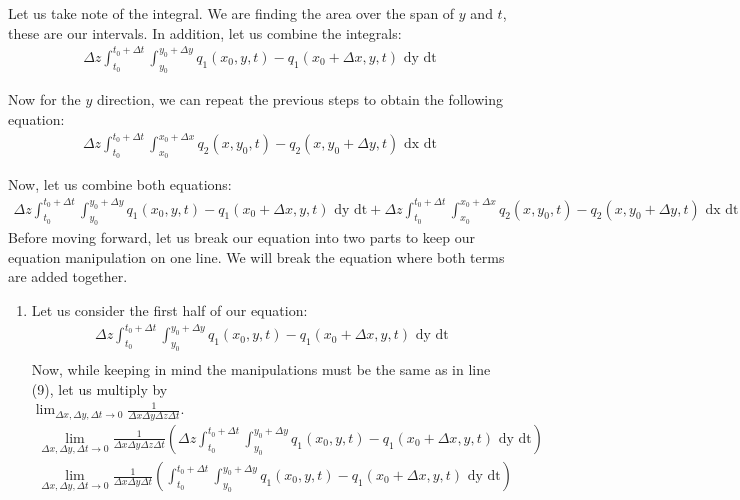 \documentclass{article}
\begin{document}
\begin{enumerate}
\begin{enumerate}
    Let us take note of the integral. We are finding the area over the span of $y$ and $t$, these are our intervals. In addition, let us combine the integrals:
    \begin{align}
      \Delta z \int^{t_0 + \Delta t}_{t_0} \int^{y_0 + \Delta y}_{y_0} q_1(x_0, y, t) - q_1(x_0 + \Delta x, y, t) \text{ dy dt}
    \end{align}

    Now for the $y$ direction, we can repeat the previous steps to obtain the following equation:
    \begin{align}
      \Delta z \int^{t_0 + \Delta t}_{t_0} \int^{x_0 + \Delta x}_{x_0} q_2(x, y_0, t) - q_2(x, y_0 + \Delta y, t) \text{ dx dt}
    \end{align}

    Now, let us combine both equations:
    \begin{align}
      \Delta z \int^{t_0 + \Delta t}_{t_0} \int^{y_0 + \Delta y}_{y_0} q_1(x_0, y, t) - q_1(x_0 + \Delta x, y, t) \text{ dy dt} + \Delta z \int^{t_0 + \Delta t}_{t_0} \int^{x_0 + \Delta x}_{x_0} q_2(x, y_0, t) - q_2(x, y_0 + \Delta y, t) \text{ dx dt}
    \end{align}
    Before moving forward, let us break our equation into two parts to keep our equation manipulation on one line. We will break the equation where both terms are added together.
    \begin{enumerate}
      \item Let us consider the first half of our equation:
      \begin{align}
        \Delta z \int^{t_0 + \Delta t}_{t_0} \int^{y_0 + \Delta y}_{y_0} q_1(x_0, y, t) - q_1(x_0 + \Delta x, y, t) \text{ dy dt}\\
      \end{align}
      Now, while keeping in mind the manipulations must be the same as in line (9), let us multiply by\\
      $\displaystyle \lim_{\Delta x, \Delta y, \Delta t \to 0} \frac{1}{\Delta x \Delta y \Delta z \Delta t}$.
      \begin{align}
        \lim_{\Delta x, \Delta y, \Delta t \to 0} \frac{1}{\Delta x \Delta y \Delta z \Delta t} \left(\Delta z \int^{t_0 + \Delta t}_{t_0} \int^{y_0 + \Delta y}_{y_0} q_1(x_0, y, t) - q_1(x_0 + \Delta x, y, t) \text{ dy dt}\right)\\
        \lim_{\Delta x, \Delta y, \Delta t \to 0} \frac{1}{\Delta x \Delta y \Delta t} \left(\int^{t_0 + \Delta t}_{t_0} \int^{y_0 + \Delta y}_{y_0} q_1(x_0, y, t) - q_1(x_0 + \Delta x, y, t) \text{ dy dt}\right)

\end{align}
\end{enumerate}
\end{enumerate}
\end{enumerate}
\end{document}
